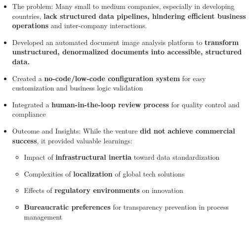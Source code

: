 \documentclass[letterpaper,11pt]{article}
\newcommand{\resumeItem}[1]{
  \item\small{
    {#1 \vspace{0pt}}
  }
}
\newcommand{\resumeItemListStart}{\begin{itemize}}
\newcommand{\resumeItemListEnd}{\end{itemize}\vspace{-5pt}}
\begin{document}

      \resumeItemListStart
        \resumeItem{The problem: Many small to medium companies, especially in developing countries, \textbf{lack structured data pipelines, hindering efficient business operations} and inter-company interactions.}
        \resumeItem{Developed an automated document image analysis platform to \textbf{transform unstructured, denormalized documents into accessible, structured data.}}
        \resumeItem{Created a \textbf{no-code/low-code configuration system} for easy customization and business logic validation}
        \resumeItem{Integrated a \textbf{human-in-the-loop review process} for quality control and compliance}
        \resumeItem{Outcome and Insights: While the venture \textbf{did not achieve commercial success}, it provided valuable learnings: 
          \begin{itemize}
            \item Impact of \textbf{infrastructural inertia} toward data standardization
            \item Complexities of \textbf{localization} of global tech solutions
            \item Effects of \textbf{regulatory environments} on innovation
            \item \textbf{Bureaucratic preferences} for transparency prevention in process management
          \end{itemize}
        }
      \resumeItemListEnd
    
\end{document}
